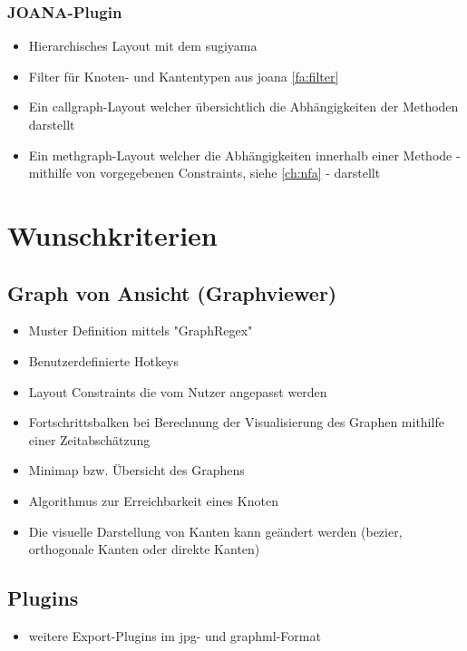   \subsubsection{JOANA-Plugin}
    \begin{itemize}
      \item Hierarchisches Layout mit dem \gls{sugiyama}   
      \item Filter für Knoten- und Kantentypen aus \gls{joana} \ref{fa:filter}
      \item Ein \gls{callgraph}-Layout welcher übersichtlich die Abhängigkeiten der Methoden darstellt
      \item Ein \gls{methgraph}-Layout welcher die Abhängigkeiten innerhalb einer Methode - mithilfe von vorgegebenen Constraints, siehe \ref{ch:nfa} - darstellt 
    \end{itemize}
  

\section{Wunschkriterien}

\subsection{Graph von Ansicht (Graphviewer)}
  \begin{itemize}
    \item Muster Definition mittels "GraphRegex"
    \item Benutzerdefinierte Hotkeys
    \item Layout Constraints die vom Nutzer angepasst werden
    \item Fortschrittsbalken bei Berechnung der Visualisierung des Graphen mithilfe einer Zeitabschätzung
    \item Minimap bzw. Übersicht des Graphens
    \item Algorithmus zur Erreichbarkeit eines Knoten
    \item Die visuelle Darstellung von Kanten kann geändert werden (\gls{bezier}, orthogonale Kanten oder direkte Kanten)
  \end{itemize}

\subsection{Plugins}
  \begin{itemize}
    \item weitere Export-Plugins im \gls{jpg}- und \gls{graphml}-Format
  \end{itemize}
  

